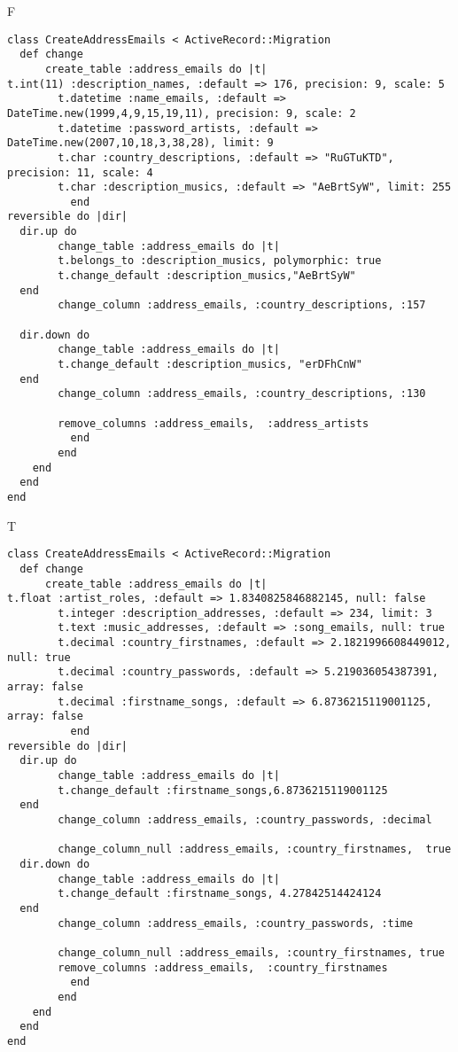 F
\begin{verbatim}
class CreateAddressEmails < ActiveRecord::Migration
  def change
	  create_table :address_emails do |t|
t.int(11) :description_names, :default => 176, precision: 9, scale: 5
		t.datetime :name_emails, :default => DateTime.new(1999,4,9,15,19,11), precision: 9, scale: 2
		t.datetime :password_artists, :default => DateTime.new(2007,10,18,3,38,28), limit: 9
		t.char :country_descriptions, :default => "RuGTuKTD", precision: 11, scale: 4
		t.char :description_musics, :default => "AeBrtSyW", limit: 255
		  end
reversible do |dir|
  dir.up do
		change_table :address_emails do |t|
		t.belongs_to :description_musics, polymorphic: true
 		t.change_default :description_musics,"AeBrtSyW"
  end
 		change_column :address_emails, :country_descriptions, :157
   
  dir.down do
		change_table :address_emails do |t|
		t.change_default :description_musics, "erDFhCnW"
  end
 		change_column :address_emails, :country_descriptions, :130
   
		remove_columns :address_emails,  :address_artists 
	      end
	    end
    end 
  end
end

\end{verbatim}

T
\begin{verbatim}
class CreateAddressEmails < ActiveRecord::Migration
  def change
	  create_table :address_emails do |t|
t.float :artist_roles, :default => 1.8340825846882145, null: false
		t.integer :description_addresses, :default => 234, limit: 3
		t.text :music_addresses, :default => :song_emails, null: true
		t.decimal :country_firstnames, :default => 2.1821996608449012, null: true
		t.decimal :country_passwords, :default => 5.219036054387391, array: false
		t.decimal :firstname_songs, :default => 6.8736215119001125, array: false
		  end
reversible do |dir|
  dir.up do
		change_table :address_emails do |t|
		t.change_default :firstname_songs,6.8736215119001125
  end
 		change_column :address_emails, :country_passwords, :decimal
   
		change_column_null :address_emails, :country_firstnames,  true
  dir.down do
		change_table :address_emails do |t|
		t.change_default :firstname_songs, 4.27842514424124
  end
 		change_column :address_emails, :country_passwords, :time
   
		change_column_null :address_emails, :country_firstnames, true
 		remove_columns :address_emails,  :country_firstnames 
	      end
	    end
    end 
  end
end

\end{verbatim}

